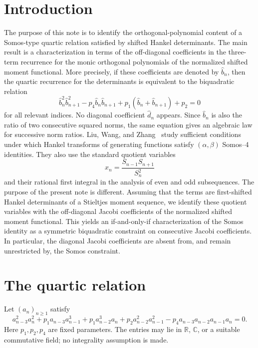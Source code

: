 \documentclass[11pt]{article}
\theoremstyle{remark}
\begin{document}
\section{Introduction}
The purpose of this note is to identify the orthogonal-polynomial content of a Somos-type quartic relation satisfied by shifted Hankel determinants. The main result is a characterization in terms of the off-diagonal coefficients in the three-term recurrence for the monic orthogonal polynomials of the normalized shifted moment functional. More precisely, if these coefficients are denoted by $\widehat b_n$, then the quartic recurrence for the determinants is equivalent to the biquadratic relation
\[
\widehat b_n^2\widehat b_{n+1}^2-p_4\widehat b_n\widehat b_{n+1}
+p_1(\widehat b_n+\widehat b_{n+1})+p_2=0
\]
for all relevant indices. No diagonal coefficient $\widehat d_n$ appears. Since $\widehat b_n$ is also the ratio of two consecutive squared norms, the same equation gives an algebraic law for successive norm ratios. Liu, Wang, and Zhang~\cite{LiuWangZhang2026} study sufficient conditions under which Hankel transforms of generating functions satisfy $(\alpha,\beta)$ Somos--4 identities. They also use the standard quotient variables \[ x_n=\frac{S_{n-1}S_{n+1}}{S_n^2} \] and their rational first integral in the analysis of even and odd subsequences. The purpose of the present note is different. Assuming that the terms are first-shifted Hankel determinants of a Stieltjes moment sequence, we identify these quotient variables with the off-diagonal Jacobi coefficients of the normalized shifted moment functional. This yields an if-and-only-if characterization of the Somos identity as a symmetric biquadratic constraint on consecutive Jacobi coefficients. In particular, the diagonal Jacobi coefficients are absent from, and remain unrestricted by, the Somos constraint.

\section{The quartic relation}
Let $(a_n)_{n\ge1}$ satisfy
\begin{equation}
 a_{n-3}^2a_n^2+p_1a_{n-3}a_{n-1}^3+p_1a_{n-2}^3a_n
 +p_2a_{n-2}^2a_{n-1}^2-p_4a_{n-3}a_{n-2}a_{n-1}a_n=0.
\end{equation}
Here $p_1,p_2,p_4$ are fixed parameters. The entries may lie in $\mathbb R$, $\mathbb C$, or a suitable commutative field; no integrality assumption is made.
\end{document}
